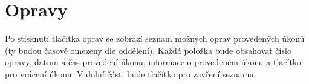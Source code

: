 \section{Opravy}

Po stisknutí tlačítka oprav se zobrazí seznam možných oprav provedených úkonů (ty budou časově omezeny dle oddělení). Každá položka bude obsahovat číslo opravy, datum a čas provedení úkonu, informace o provedeném úkonu a tlačítko pro vrácení úkonu. V dolní části bude tlačítko pro zavření seznamu.